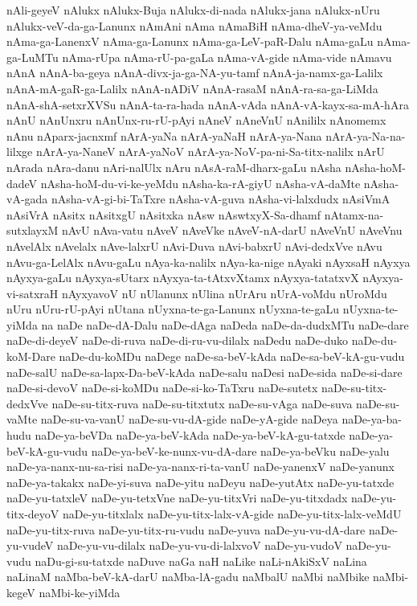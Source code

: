 {nAli-geyeV
nAlukx
nAlukx-Buja
nAlukx-di-nada
nAlukx-jana
nAlukx-nUru
nAlukx-veV-da-ga-Lanunx
nAmAni
nAma
nAmaBiH
nAma-dheV-ya-veMdu
nAma-ga-LanenxV
nAma-ga-Lanunx
nAma-ga-LeV-paR-Dalu
nAma-gaLu
nAma-ga-LuMTu
nAma-rUpa
nAma-rU-pa-gaLa
nAma-vA-gide
nAma-vide
nAmavu
nAnA
nAnA-ba-geya
nAnA-divx-ja-ga-NA-yu-tamf
nAnA-ja-namx-ga-Lalilx
nAnA-mA-gaR-ga-Lalilx
nAnA-nADiV
nAnA-rasaM
nAnA-ra-sa-ga-LiMda
nAnA-shA-setxrXVSu
nAnA-ta-ra-hada
nAnA-vAda
nAnA-vA-kayx-sa-mA-hAra
nAnU
nAnUnxru
nAnUnx-ru-rU-pAyi
nAneV
nAneVnU
nAnililx
nAnomemx
nAnu
nAparx-jacnxmf
nArA-yaNa
nArA-yaNaH
nArA-ya-Nana
nArA-ya-Na-na-lilxge
nArA-ya-NaneV
nArA-yaNoV
nArA-ya-NoV-pa-ni-Sa-titx-nalilx
nArU
nArada
nAra-danu
nAri-nalUlx
nAru
nAsA-raM-dharx-gaLu
nAsha
nAsha-hoM-dadeV
nAsha-hoM-du-vi-ke-yeMdu
nAsha-ka-rA-giyU
nAsha-vA-daMte
nAsha-vA-gada
nAsha-vA-gi-bi-TaTxre
nAsha-vA-guva
nAsha-vi-lalxdudx
nAsiVmA
nAsiVrA
nAsitx
nAsitxgU
nAsitxka
nAsw
nAswtxyX-Sa-dhamf
nAtamx-na-sutxlayxM
nAvU
nAva-vatu
nAveV
nAveVke
nAveV-nA-darU
nAveVnU
nAveVnu
nAvelAlx
nAvelalx
nAve-lalxrU
nAvi-Duva
nAvi-babxrU
nAvi-dedxVve
nAvu
nAvu-ga-LelAlx
nAvu-gaLu
nAya-ka-nalilx
nAya-ka-nige
nAyaki
nAyxsaH
nAyxya
nAyxya-gaLu
nAyxya-sUtarx
nAyxya-ta-tAtxvXtamx
nAyxya-tatatxvX
nAyxya-vi-satxraH
nAyxyavoV
nU
nUlanunx
nUlina
nUrAru
nUrA-voMdu
nUroMdu
nUru
nUru-rU-pAyi
nUtana
nUyxna-te-ga-Lanunx
nUyxna-te-gaLu
nUyxna-te-yiMda
na
naDe
naDe-dA-Dalu
naDe-dAga
naDeda
naDe-da-dudxMTu
naDe-dare
naDe-di-deyeV
naDe-di-ruva
naDe-di-ru-vu-dilalx
naDedu
naDe-duko
naDe-du-koM-Dare
naDe-du-koMDu
naDege
naDe-sa-beV-kAda
naDe-sa-beV-kA-gu-vudu
naDe-salU
naDe-sa-lapx-Da-beV-kAda
naDe-salu
naDesi
naDe-sida
naDe-si-dare
naDe-si-devoV
naDe-si-koMDu
naDe-si-ko-TaTxru
naDe-sutetx
naDe-su-titx-dedxVve
naDe-su-titx-ruva
naDe-su-titxtutx
naDe-su-vAga
naDe-suva
naDe-su-vaMte
naDe-su-va-vanU
naDe-su-vu-dA-gide
naDe-yA-gide
naDeya
naDe-ya-ba-hudu
naDe-ya-beVDa
naDe-ya-beV-kAda
naDe-ya-beV-kA-gu-tatxde
naDe-ya-beV-kA-gu-vudu
naDe-ya-beV-ke-nunx-vu-dA-dare
naDe-ya-beVku
naDe-yalu
naDe-ya-nanx-nu-sa-risi
naDe-ya-nanx-ri-ta-vanU
naDe-yanenxV
naDe-yanunx
naDe-ya-takakx
naDe-yi-suva
naDe-yitu
naDeyu
naDe-yutAtx
naDe-yu-tatxde
naDe-yu-tatxleV
naDe-yu-tetxVne
naDe-yu-titxVri
naDe-yu-titxdadx
naDe-yu-titx-deyoV
naDe-yu-titxlalx
naDe-yu-titx-lalx-vA-gide
naDe-yu-titx-lalx-veMdU
naDe-yu-titx-ruva
naDe-yu-titx-ru-vudu
naDe-yuva
naDe-yu-vu-dA-dare
naDe-yu-vudeV
naDe-yu-vu-dilalx
naDe-yu-vu-di-lalxvoV
naDe-yu-vudoV
naDe-yu-vudu
naDu-gi-su-tatxde
naDuve
naGa
naH
naLike
naLi-nAkiSxV
naLina
naLinaM
naMba-beV-kA-darU
naMba-lA-gadu
naMbalU
naMbi
naMbike
naMbi-kegeV
naMbi-ke-yiMda
}

